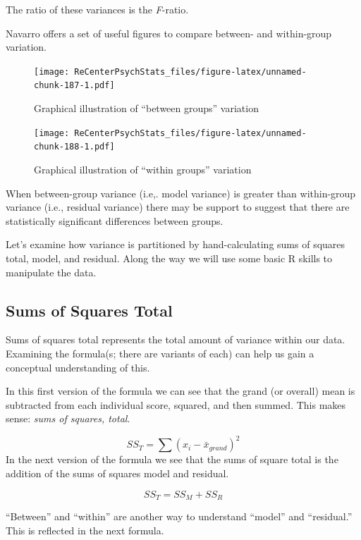 \documentclass[
  11pt,
]{book}
\begin{document}
The ratio of these variances is the \emph{F}-ratio.

Navarro \citeyearpar{navarro_book_2020} offers a set of useful figures to compare between- and within-group variation.

\begin{figure}
\centering
\texttt{[image: ReCenterPsychStats\_files/figure-latex/unnamed-chunk-187-1.pdf]}
\caption{\label{fig:unnamed-chunk-187}Graphical illustration of ``between groups'' variation}
\end{figure}

\begin{figure}
\centering
\texttt{[image: ReCenterPsychStats\_files/figure-latex/unnamed-chunk-188-1.pdf]}
\caption{\label{fig:unnamed-chunk-188}Graphical illustration of ``within groups'' variation}
\end{figure}

When between-group variance (i.e,. model variance) is greater than within-group variance (i.e., residual variance) there may be support to suggest that there are statistically significant differences between groups.

Let's examine how variance is partitioned by hand-calculating sums of squares total, model, and residual. Along the way we will use some basic R skills to manipulate the data.

\hypertarget{sums-of-squares-total}{%
\subsection{Sums of Squares Total}\label{sums-of-squares-total}}

Sums of squares total represents the total amount of variance within our data. Examining the formula(s; there are variants of each) can help us gain a conceptual understanding of this.

In this first version of the formula we can see that the grand (or overall) mean is subtracted from each individual score, squared, and then summed. This makes sense: \emph{sums of squares, total}.

\[SS_{T}= \sum (x_{i}-\bar{x}_{grand})^{2}\]
In the next version of the formula we see that the sums of square total is the addition of the sums of squares model and residual.

\[SS_{T}= SS_{M} + SS_{R}\]

``Between'' and ``within'' are another way to understand ``model'' and ``residual.'' This is reflected in the next formula.
\end{document}
